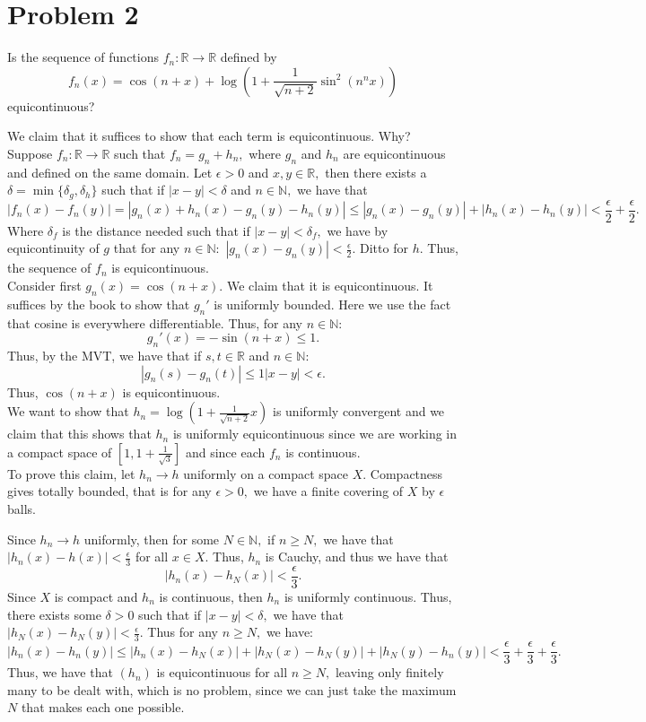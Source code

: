 \documentclass[11pt]{article}
\newcommand{\bbN}{\mathbb{N}}
\newcommand{\bbR}{\mathbb{R}}
\begin{document}
\section*{Problem 2}
\begin{Problem}
    Is the sequence of functions $f_n: \bbR \to \bbR$ defined by 
    \[f_n(x) = \cos(n+x) + \log(1 + \frac{1}{\sqrt{n + 2}}\sin^2(n^nx))\] equicontinuous?
\end{Problem}
\begin{solution}
    We claim that it suffices to show that each term is equicontinuous. Why? Suppose $f_n: \bbR \to \bbR$ such that $f_n = g_n  + h_n,$ where $g_n$ and $h_n$ are equicontinuous and defined on the same domain. Let $\epsilon>0$ and $x,y \in \bbR,$ then there exists a $\delta = \min\{\delta_g, \delta_h\}$ such that if $|x-y|< \delta$ and $n\in \bbN,$ we have that 
    \[|f_n(x) - f_n(y)| = |g_n(x)  + h_n(x) - g_n(y)  - h_n(y)|\leq |g_n(x) - g_n(y)| + |h_n(x) - h_n(y)|<\frac{\epsilon}{2} + \frac{\epsilon}{2}.\] Where $\delta_f$ is the distance needed such that if $|x-y|< \delta_f,$ we have by equicontinuity of $g$ that for any $n\in \bbN:$ $|g_n(x) - g_n(y)|<\frac{\epsilon}{2}.$ Ditto for $h.$ Thus, the sequence of $f_n$ is equicontinuous.\\

    Consider first $g_n(x) = \cos(n + x).$ We claim that it is equicontinuous. It suffices by the book to show that $g_n'$ is uniformly bounded. Here we use the fact that cosine is everywhere differentiable. Thus, for any $n \in \bbN:$
    \[g_n'(x) = -\sin(n + x)\leq 1.\] Thus, by the MVT, we have that if $s,t\in \bbR$ and $n\in \bbN:$ 
    \[|g_n(s) - g_n(t)|\leq 1|x-y|< \epsilon.\] Thus, $\cos(n+x)$ is equicontinuous.\\

    We want to show that $h_n = \log(1 + \frac{1}{\sqrt{n+2}}x)$ is uniformly convergent and we claim that this shows that $h_n$ is uniformly equicontinuous since we are working in a compact space of $[1, 1 + \frac{1}{\sqrt{3}}]$ and since each $f_n$ is continuous.\\
    
    To prove this claim, let $h_n \to h$ uniformly on a compact space $X.$ Compactness gives totally bounded, that is for any $\epsilon>0,$ we have a finite covering of $X$ by $\epsilon$ balls. 

    Since $h_n \to h$ uniformly, then for some $N \in \bbN,$ if $n\geq N,$ we have that $|h_n(x) - h(x)|< \frac{\epsilon}{3}$ for all $x\in X.$ Thus, $h_n$ is Cauchy, and thus we have that 
    \[|h_n(x) - h_N(x)|< \frac{\epsilon}{3}.\] Since $X$ is compact and $h_n$ is continuous, then $h_n$ is uniformly continuous. Thus, there exists some $\delta>0$ such that if $|x-y|<\delta,$ we have that $|h_N(x) - h_N(y)|< \frac{\epsilon}{3}.$ Thus for any $n \geq N,$ we have:
    \[|h_n(x) - h_n(y)| \leq |h_n(x) - h_N(x)| + |h_N(x) - h_N(y)| + |h_N(y) - h_n(y)|< \frac{\epsilon}{3} + \frac{\epsilon}{3} + \frac{\epsilon}{3}.\]
    Thus, we have that $(h_n)$ is equicontinuous for all $n\geq N,$ leaving only finitely many to be dealt with, which is no problem, since we can just take the maximum $N$ that makes each one possible.
    

\end{solution}
\end{document}
